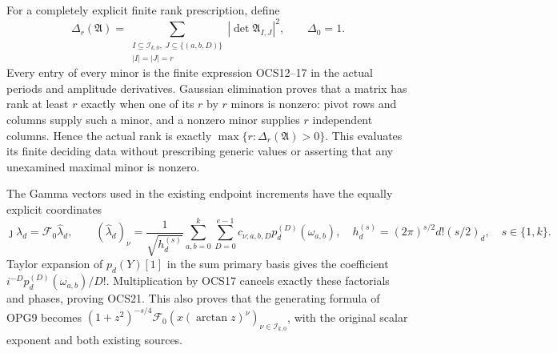\documentclass[11pt,a4paper]{article}
\begin{document}
For a completely explicit finite rank prescription, define
\[
 \Delta_r(\mathfrak A)=
   \sum_{\substack{I\subseteq\mathcal I_{k,0},\ J\subseteq\{(a,b,D)\}\\
                   |I|=|J|=r}}|\det\mathfrak A_{I,J}|^2,
 \qquad\Delta_0=1.
 \tag{OCS20}
\]
Every entry of every minor is the finite expression OCS12--17
in the actual periods and amplitude derivatives. Gaussian
elimination proves that a matrix has rank at least $r$ exactly
when one of its $r$ by $r$ minors is nonzero: pivot rows and
columns supply such a minor, and a nonzero minor supplies $r$
independent columns. Hence the actual rank is exactly
$\max\{r:\Delta_r(\mathfrak A)>0\}$. This evaluates its
finite deciding data without prescribing generic values or
asserting that any unexamined maximal minor is nonzero.

The Gamma vectors used in the existing endpoint increments have
the equally explicit coordinates
\[
 \jmath\lambda_d=\mathcal F_0\widehat\lambda_d,
 \qquad
 (\widehat\lambda_d)_\nu=
 \frac1{\sqrt{h_d^{(s)}}}\sum_{a,b=0}^k\sum_{D=0}^{e-1}
               c_{\nu;a,b,D}p_d^{(D)}(\omega_{a,b}),
 \quad h_d^{(s)}=(2\pi)^{s/2}d!(s/2)_d,
 \quad s\in\{1,k\}.
 \tag{OCS21}
\]
Taylor expansion of $p_d(Y)[1]$ in the sum primary basis gives
the coefficient $i^{-D}p_d^{(D)}(\omega_{a,b})/D!$.
Multiplication by OCS17 cancels exactly these factorials and
phases, proving OCS21. This also proves that the generating
formula of OPG9 becomes
$(1+z^2)^{-s/4}\mathcal F_0
 (x(\arctan z)^\nu)_{\nu\in\mathcal I_{k,0}}$,
with the original scalar exponent and both existing sources.
\end{document}
